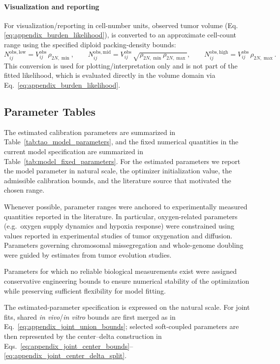 \documentclass[11pt]{article}
\begin{document}
\paragraph{Visualization and reporting}

For visualization/reporting in cell-number units, observed tumor volume (Eq. \eqref{eq:appendix_burden_likelihood}), is converted to an approximate cell-count range using the specified diploid packing-density bounds:
\begin{equation}
N^{\mathrm{obs,low}}_{ij}
=
V^{\mathrm{obs}}_{ij}\,\rho_{2N,\min},
\qquad
N^{\mathrm{obs,mid}}_{ij}
=
V^{\mathrm{obs}}_{ij}\,\sqrt{\rho_{2N,\min}\rho_{2N,\max}},
\qquad
N^{\mathrm{obs,high}}_{ij}
=
V^{\mathrm{obs}}_{ij}\,\rho_{2N,\max}.
\label{eq:appendix_obs_volume_to_cells}
\end{equation}
This conversion is used for plotting/interpretation only and is not part of the fitted likelihood, which is evaluated directly in the volume domain via Eq.~\eqref{eq:appendix_burden_likelihood}.

\subsection{Parameter Tables}

The estimated calibration parameters are summarized in
Table~\ref{tab:tao_model_parameters}, and the fixed numerical quantities in the
current model specification are summarized in
Table~\ref{tab:model_fixed_parameters}.
For the estimated parameters we report the model parameter in natural scale,
the optimizer initialization value, the admissible calibration bounds, and the
literature source that motivated the chosen range.

Whenever possible, parameter ranges were anchored to experimentally 
measured quantities reported in the literature.  
In particular, oxygen-related parameters (e.g.\ oxygen supply dynamics 
and hypoxia response) were constrained using values reported in 
experimental studies of tumor oxygenation and diffusion.  
Parameters governing chromosomal missegregation and whole-genome 
doubling were guided by estimates from tumor evolution studies.

Parameters for which no reliable biological measurements exist were 
assigned conservative engineering bounds to ensure numerical stability 
of the optimization while preserving sufficient flexibility for model fitting.

The estimated-parameter specification is expressed on the natural scale.
For joint fits, shared \textit{in vivo}/\textit{in vitro} bounds are first merged as in Eq.~\eqref{eq:appendix_joint_union_bounds}; selected soft-coupled parameters are then represented by the center--delta construction in Eqs.~\eqref{eq:appendix_joint_center_bounds}--\eqref{eq:appendix_joint_center_delta_split}.


\clearpage



\clearpage

 

\end{document}
